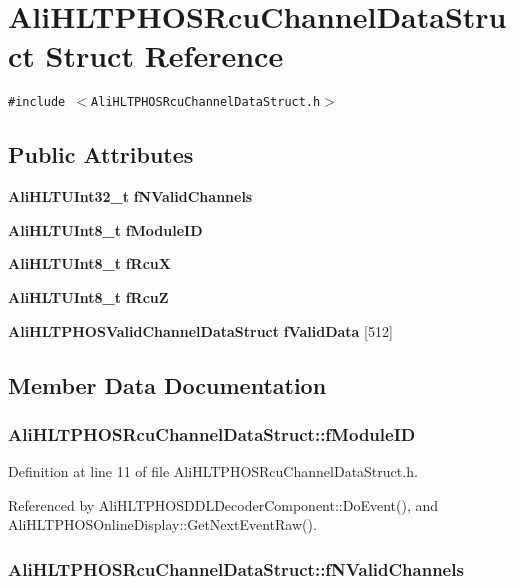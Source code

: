 \section{Ali\-HLTPHOSRcu\-Channel\-Data\-Struct Struct Reference}
\label{structAliHLTPHOSRcuChannelDataStruct}
{\tt \#include $<$Ali\-HLTPHOSRcu\-Channel\-Data\-Struct.h$>$}

\subsection*{Public Attributes}
\begin{CompactItemize}
\item 
{\bf Ali\-HLTUInt32\_\-t} {\bf f\-NValid\-Channels}
\item 
{\bf Ali\-HLTUInt8\_\-t} {\bf f\-Module\-ID}
\item 
{\bf Ali\-HLTUInt8\_\-t} {\bf f\-Rcu\-X}
\item 
{\bf Ali\-HLTUInt8\_\-t} {\bf f\-Rcu\-Z}
\item 
{\bf Ali\-HLTPHOSValid\-Channel\-Data\-Struct} {\bf f\-Valid\-Data} [512]
\end{CompactItemize}


\subsection{Member Data Documentation}
\subsubsection{ {\bf Ali\-HLTPHOSRcu\-Channel\-Data\-Struct::f\-Module\-ID}}\label{structAliHLTPHOSRcuChannelDataStruct_o1}




Definition at line 11 of file Ali\-HLTPHOSRcu\-Channel\-Data\-Struct.h.

Referenced by Ali\-HLTPHOSDDLDecoder\-Component::Do\-Event(), and Ali\-HLTPHOSOnline\-Display::Get\-Next\-Event\-Raw().
\subsubsection{ {\bf Ali\-HLTPHOSRcu\-Channel\-Data\-Struct::f\-NValid\-Channels}}\label{structAliHLTPHOSRcuChannelDataStruct_o0}




